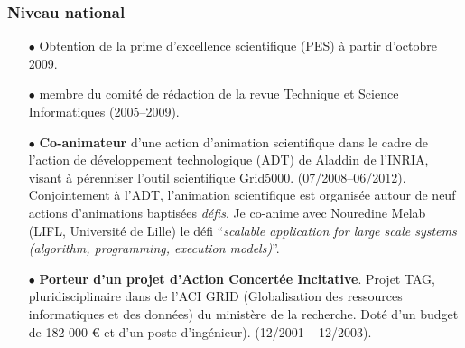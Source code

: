 \documentclass[11pt]{article}
\begin{document}
\subsubsection{Niveau national}
\begin{itemize}

\item[$\bullet$] Obtention de la prime d'excellence scientifique (PES) à partir d'octobre 2009.\\

\item [$\bullet$]
membre du comité de rédaction de la revue Technique et Science Informatiques (2005--2009).\\

\item[$\bullet$]
\textbf{Co-animateur} d'une action d'animation scientifique 
dans le cadre de l'action de développement technologique (ADT) de Aladdin de l'INRIA, 
visant à pérenniser l'outil scientifique Grid5000. (07/2008--06/2012). 
Conjointement à l'ADT, l'animation scientifique est organisée autour de neuf actions d'animations baptisées \emph{défis}.
Je co-anime avec Nouredine Melab (LIFL, Université de Lille) le défi 
``{\em scalable application for large scale systems (algorithm, programming, execution models)}''.\\

\item[$\bullet$]
\textbf{Porteur d'un projet d'Action Concertée Incitative}. Projet TAG, 
pluridisciplinaire dans de l'ACI GRID (Globalisation des ressources informatiques et des données) 
du ministère de la recherche. Doté d'un budget de 182 000 \euro{} et d'un poste d'ingénieur). 
(12/2001 -- 12/2003).\\
\end{itemize}
\end{document}
